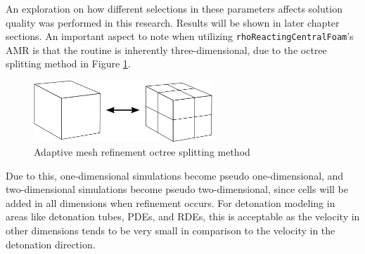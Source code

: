 An exploration on how different selections in these parameters affects solution quality was performed in this research. Results will be shown in later chapter sections. An important aspect to note when utilizing \verb|rhoReactingCentralFoam|'s AMR is that the routine is inherently three-dimensional, due to the octree splitting method in Figure \ref{fig:octree}. 
\begin{figure}[b]
\centering
\includegraphics[width=0.6\textwidth]{./figs/amr_example.png}
\caption{Adaptive mesh refinement octree splitting method}
\label{fig:octree}
\end{figure}%
\noindent Due to this, one-dimensional simulations become pseudo one-dimensional, and two-dimensional simulations become pseudo two-dimensional, since cells will be added in all dimensions when refinement occurs. For detonation modeling in areas like detonation tubes, PDEs, and RDEs, this is acceptable as the velocity in other dimensions tends to be very small in comparison to the velocity in the detonation direction. 

